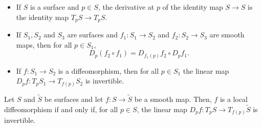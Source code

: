 \begin{proposition}
  \begin{itemize}
    \item If $S$ is a surface and $p \in S$, the derivative at $p$ of the
    identity map $S \to S$ is the identity map $T_p S \to T_p S$.
    \item If $S_1, S_2$ and $S_3$ are surfaces and $f_1 : S_1 \to S_2$
    and $f_2: S_2 \to S_3$ are smooth maps, then for all $p \in S_1$,
    \[
      D_p(f_2 \circ f_1) = D_{f_1(p)} f_2 \circ D_p f_1.
    \]
    \item If $f: S_1 \to S_2$ is a diffeomorphism, then for all $p \in S_1$
    the linear map $D_p f: T_p S_1 \to T_{f(p)} S_2$ is invertible.
  \end{itemize}
\end{proposition}

\begin{proposition}
  Let $S$ and $\tilde S$ be surfaces and let $f: S \to \tilde S$ be a
  smooth map. Then, $f$ is a local diffeomorphism if and only if,
  for all $p \in S$, the linear map $D_p f: T_p S \to T_{f(p)} \tilde S$
  is invertible.
\end{proposition}